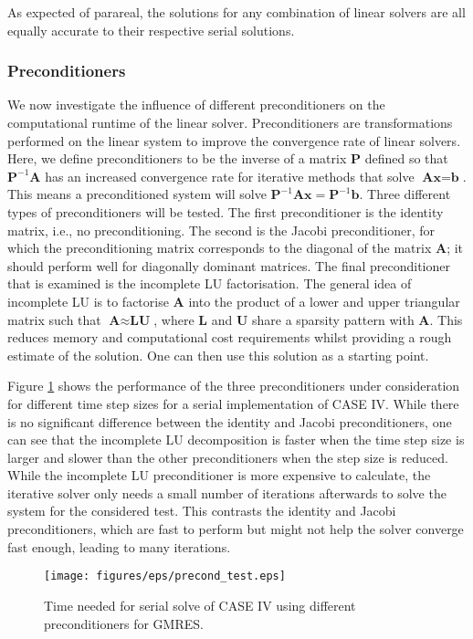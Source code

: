 As expected of parareal, the solutions for any combination of linear solvers are all equally accurate to their respective serial solutions. 

\subsubsection{Preconditioners}
\label{sec: precond}
We now investigate the influence of different preconditioners on the computational runtime of the linear solver. 
Preconditioners are transformations performed on the linear system to improve the convergence rate of linear solvers. Here, we define preconditioners to be the inverse of a matrix $\textbf{P}$ defined so that $\textbf{P}^{-1}\textbf{A}$ has an increased convergence rate for iterative methods that solve $\textbf{Ax} = \textbf{b}$. This means a preconditioned system will solve $\textbf{P}^{-1}\textbf{Ax} = \textbf{P}^{-1}\textbf{b}$. Three different types of preconditioners will be tested. The first preconditioner is the identity matrix, i.e., no preconditioning. The second is the Jacobi preconditioner, for which the preconditioning matrix corresponds to the diagonal of the matrix $\textbf{A}$; it should perform well for diagonally dominant matrices. The final preconditioner that is examined is the incomplete LU factorisation. The general idea of incomplete LU is to factorise $\textbf{A}$ into the product of a lower and upper triangular matrix such that $\textbf{A} \approx \textbf{LU}$, where $\textbf{L}$ and $\textbf{U}$ share a sparsity pattern with $\textbf{A}$. This reduces memory and computational cost requirements whilst providing a rough estimate of the solution. One can then use this solution as a starting point.

Figure \ref{fig: preconditioners} shows the performance of the three preconditioners under consideration for different time step sizes for a serial implementation of CASE IV. While there is no significant difference between the identity and Jacobi preconditioners, one can see that the incomplete LU decomposition is faster when the time step size is larger and slower than the other preconditioners when the step size is reduced. While the incomplete LU preconditioner is more expensive to calculate, the iterative solver only needs a small number of iterations afterwards to solve the system for the considered test. This contrasts the identity and Jacobi preconditioners, which are fast to perform but might not help the solver converge fast enough, leading to many iterations.
 \begin{figure}[h]
    \centering
    \texttt{[image: figures/eps/precond\_test.eps]}
    \caption{Time needed for serial solve of CASE IV using different preconditioners for GMRES.}
    \label{fig: preconditioners}
\end{figure}

